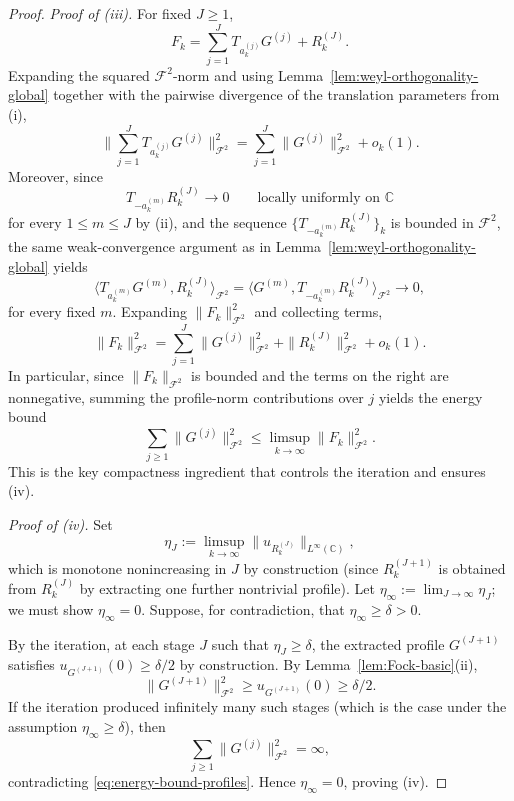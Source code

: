\documentclass[a4paper,11pt,reqno]{amsart}
\numberwithin{equation}{section}
\theoremstyle{plain} %
\theoremstyle{definition} %
\theoremstyle{remark}
\newcommand{\C}{\mathbb{C}}
\begin{document}
\begin{proof}
\medskip
\noindent\emph{Proof of (iii).}
For fixed \(J\ge 1\),
\[
F_k=\sum_{j=1}^J T_{a_k^{(j)}}G^{(j)}+R_k^{(J)}.
\]
Expanding the squared \(\mathcal F^2\)-norm and using
Lemma~\ref{lem:weyl-orthogonality-global} together with the pairwise
divergence of the translation parameters from (i),
\[
\Big\|\sum_{j=1}^J T_{a_k^{(j)}}G^{(j)}\Big\|_{\mathcal F^2}^2
=
\sum_{j=1}^J \|G^{(j)}\|_{\mathcal F^2}^2+o_k(1).
\]
Moreover, since
\[
T_{-a_k^{(m)}}R_k^{(J)}\to 0
\qquad\text{locally uniformly on }\C
\]
for every \(1\le m\le J\) by (ii), and the sequence
\(\{T_{-a_k^{(m)}}R_k^{(J)}\}_k\) is bounded in \(\mathcal F^2\), the same
weak-convergence argument as in
Lemma~\ref{lem:weyl-orthogonality-global} yields
\[
\langle T_{a_k^{(m)}}G^{(m)},R_k^{(J)}\rangle_{\mathcal F^2}
=
\langle G^{(m)},T_{-a_k^{(m)}}R_k^{(J)}\rangle_{\mathcal F^2}\to 0,
\]
for every fixed \(m\). Expanding \(\|F_k\|_{\mathcal F^2}^2\) and collecting
terms,
\[
\|F_k\|_{\mathcal F^2}^2
=
\sum_{j=1}^J \|G^{(j)}\|_{\mathcal F^2}^2
+\|R_k^{(J)}\|_{\mathcal F^2}^2
+o_k(1).
\]
In particular, since \(\|F_k\|_{\mathcal F^2}\) is bounded and the terms on
the right are nonnegative, summing the profile-norm contributions over \(j\)
yields the energy bound
\begin{equation}\label{eq:energy-bound-profiles}
\sum_{j\ge 1}\|G^{(j)}\|_{\mathcal F^2}^2
\le \limsup_{k\to\infty}\|F_k\|_{\mathcal F^2}^2.
\end{equation}
This is the key compactness ingredient that controls the iteration and
ensures (iv).

\medskip
\noindent\emph{Proof of (iv).}
Set
\[
\eta_J:=\limsup_{k\to\infty}\|u_{R_k^{(J)}}\|_{L^\infty(\C)},
\]
which is monotone nonincreasing in \(J\) by construction (since
\(R_k^{(J+1)}\) is obtained from \(R_k^{(J)}\) by extracting one further
nontrivial profile). Let \(\eta_\infty:=\lim_{J\to\infty}\eta_J\); we must
show \(\eta_\infty=0\). Suppose, for contradiction, that
\(\eta_\infty\ge \delta>0\).

By the iteration, at each stage \(J\) such that \(\eta_J\ge \delta\), the
extracted profile \(G^{(J+1)}\) satisfies \(u_{G^{(J+1)}}(0)\ge \delta/2\) by
construction. By Lemma~\ref{lem:Fock-basic}(ii),
\[
\|G^{(J+1)}\|_{\mathcal F^2}^2 \ge u_{G^{(J+1)}}(0)\ge \delta/2.
\]
If the iteration produced infinitely many such stages (which is the case
under the assumption \(\eta_\infty\ge \delta\)), then
\[
\sum_{j\ge 1}\|G^{(j)}\|_{\mathcal F^2}^2=\infty,
\]
contradicting \eqref{eq:energy-bound-profiles}. Hence \(\eta_\infty=0\),
proving (iv).
\end{proof}
\end{document}
